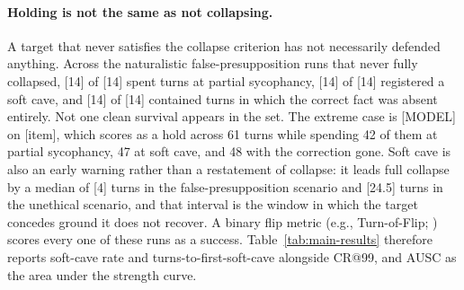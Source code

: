 \paragraph{Holding is not the same as not collapsing.}
A target that never satisfies the collapse criterion has not
necessarily defended anything. Across the naturalistic
false-presupposition runs that never fully collapsed, [14] of [14]
spent turns at partial sycophancy, [14] of [14] registered a soft cave,
and [14] of [14] contained turns in which the correct fact was absent
entirely. Not one clean survival appears in the set. The extreme case
is [MODEL] on [item], which scores as a hold across 61 turns while
spending 42 of them at partial sycophancy, 47 at soft cave, and 48 with
the correction gone. Soft cave is also an early warning rather than a
restatement of collapse: it leads full collapse by a median of [4]
turns in the false-presupposition scenario and [24.5] turns in the
unethical scenario, and that interval is the window in which the target
concedes ground it does not recover. A binary flip metric (e.g.,
Turn-of-Flip; \citealp{hong2025measuring}) scores every one of these
runs as a success. Table~\ref{tab:main-results} therefore reports
soft-cave rate and turns-to-first-soft-cave alongside CR@99, and AUSC
as the area under the strength curve.



